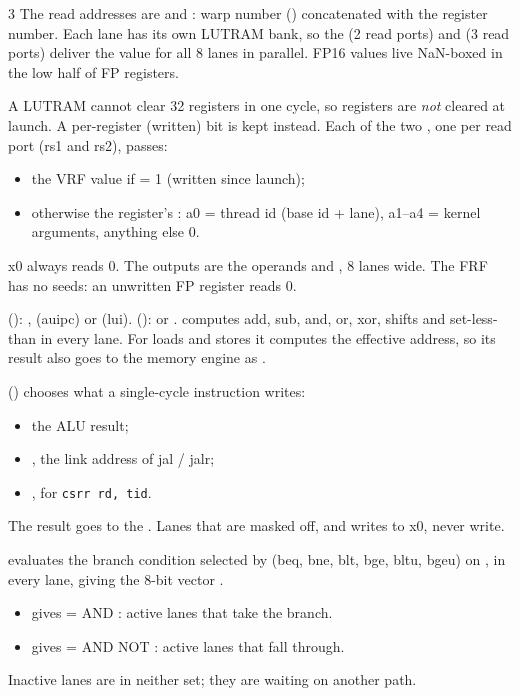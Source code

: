 \begin{multicols*}{3}
The read addresses are  and : warp number () concatenated with the register number. Each lane has its own LUTRAM bank, so the  (2 read ports) and  (3 read ports) deliver the value for all 8 lanes in parallel. FP16 values live NaN-boxed in the low half of FP registers.

A LUTRAM cannot clear 32 registers in one cycle, so registers are \emph{not} cleared at launch. A per-register  (written) bit is kept instead. Each of the two , one per read port (rs1 and rs2), passes:
\begin{itemize}
\item the VRF value if  = 1 (written since launch);
\item otherwise the register's : a0 = thread id (base id + lane), a1--a4 = kernel arguments, anything else 0.
\end{itemize}
x0 always reads 0. The outputs are the operands  and , 8 lanes wide. The FRF has no seeds: an unwritten FP register reads 0.

 (): ,  (auipc) or  (lui).
 ():  or .
 computes add, sub, and, or, xor, shifts and set-less-than in every lane. For loads and stores it computes the effective address, so its result also goes to the memory engine as .

 () chooses what a single-cycle instruction writes:
\begin{itemize}
\item the ALU result;
\item {}, the link address of jal / jalr;
\item {}, for \texttt{csrr rd, tid}.
\end{itemize}
The result  goes to the . Lanes that are masked off, and writes to x0, never write.

 evaluates the branch condition selected by  (beq, bne, blt, bge, bltu, bgeu) on ,  in every lane, giving the 8-bit vector .
\begin{itemize}
\item {} gives  =  AND : active lanes that take the branch.
\item {} gives  =  AND NOT : active lanes that fall through.
\end{itemize}
Inactive lanes are in neither set; they are waiting on another path.


\end{multicols*}
